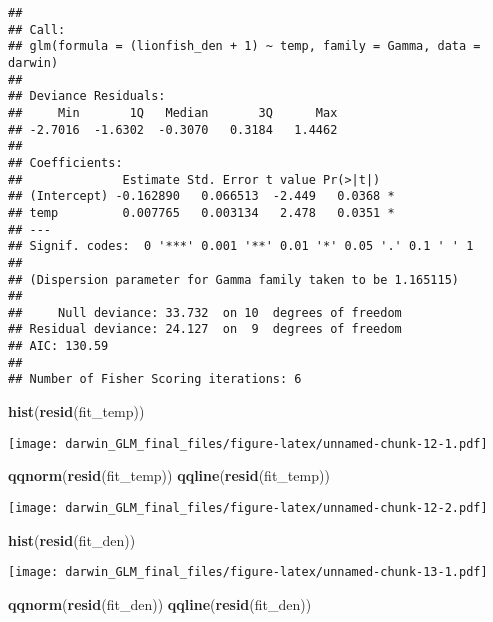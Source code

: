 \documentclass[]{article}
\newenvironment{Shaded}{\begin{snugshade}}{\end{snugshade}}
\newcommand{\KeywordTok}[1]{\textcolor[rgb]{0.13,0.29,0.53}{\textbf{#1}}}
\newcommand{\NormalTok}[1]{#1}
\begin{document}
\begin{verbatim}
## 
## Call:
## glm(formula = (lionfish_den + 1) ~ temp, family = Gamma, data = darwin)
## 
## Deviance Residuals: 
##     Min       1Q   Median       3Q      Max  
## -2.7016  -1.6302  -0.3070   0.3184   1.4462  
## 
## Coefficients:
##              Estimate Std. Error t value Pr(>|t|)  
## (Intercept) -0.162890   0.066513  -2.449   0.0368 *
## temp         0.007765   0.003134   2.478   0.0351 *
## ---
## Signif. codes:  0 '***' 0.001 '**' 0.01 '*' 0.05 '.' 0.1 ' ' 1
## 
## (Dispersion parameter for Gamma family taken to be 1.165115)
## 
##     Null deviance: 33.732  on 10  degrees of freedom
## Residual deviance: 24.127  on  9  degrees of freedom
## AIC: 130.59
## 
## Number of Fisher Scoring iterations: 6
\end{verbatim}

\begin{Shaded}
\begin{Highlighting}[]
\KeywordTok{hist}\NormalTok{(}\KeywordTok{resid}\NormalTok{(fit_temp))}
\end{Highlighting}
\end{Shaded}

\texttt{[image: darwin\_GLM\_final\_files/figure-latex/unnamed-chunk-12-1.pdf]}

\begin{Shaded}
\begin{Highlighting}[]
\KeywordTok{qqnorm}\NormalTok{(}\KeywordTok{resid}\NormalTok{(fit_temp))}
\KeywordTok{qqline}\NormalTok{(}\KeywordTok{resid}\NormalTok{(fit_temp))}
\end{Highlighting}
\end{Shaded}

\texttt{[image: darwin\_GLM\_final\_files/figure-latex/unnamed-chunk-12-2.pdf]}

\begin{Shaded}
\begin{Highlighting}[]
\KeywordTok{hist}\NormalTok{(}\KeywordTok{resid}\NormalTok{(fit_den))}
\end{Highlighting}
\end{Shaded}

\texttt{[image: darwin\_GLM\_final\_files/figure-latex/unnamed-chunk-13-1.pdf]}

\begin{Shaded}
\begin{Highlighting}[]
\KeywordTok{qqnorm}\NormalTok{(}\KeywordTok{resid}\NormalTok{(fit_den))}
\KeywordTok{qqline}\NormalTok{(}\KeywordTok{resid}\NormalTok{(fit_den))}
\end{Highlighting}
\end{Shaded}
\end{document}
